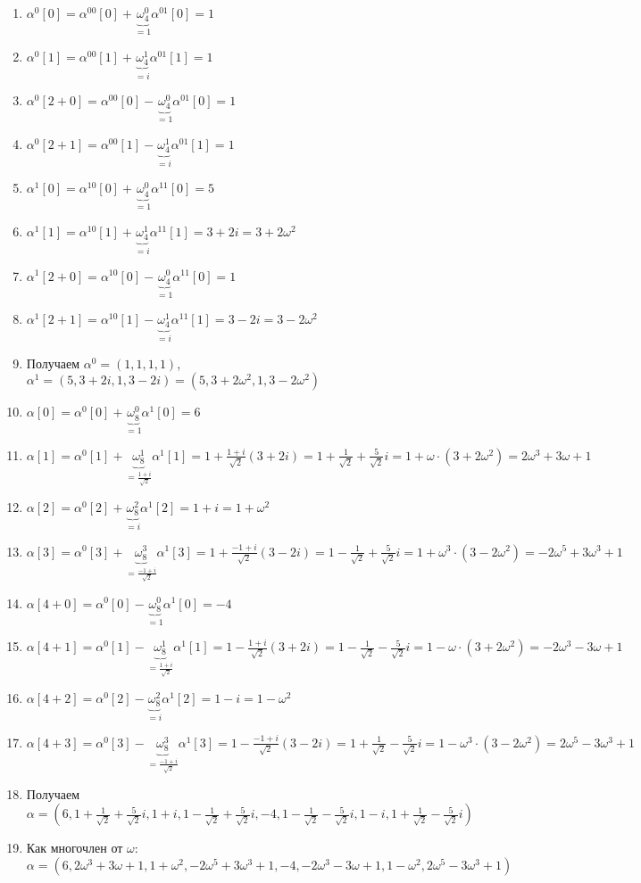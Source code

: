 \documentclass[a4paper]{article}
\begin{document}
\begin{enumerate}
\begin{enumerate}
\item $\alpha^0[0]=\alpha^{00}[0]+\underbrace{\omega_4^0}_{=1}\alpha^{01}[0]=1$
\item $\alpha^0[1]=\alpha^{00}[1]+\underbrace{\omega_4^1}_{=i}\alpha^{01}[1]=1$
\item $\alpha^0[2+0]=\alpha^{00}[0]-\underbrace{\omega_4^0}_{=1}\alpha^{01}[0]=1$
\item $\alpha^0[2+1]=\alpha^{00}[1]-\underbrace{\omega_4^1}_{=i}\alpha^{01}[1]=1$
\item $\alpha^1[0]=\alpha^{10}[0]+\underbrace{\omega_4^0}_{=1}\alpha^{11}[0]=5$
\item $\alpha^1[1]=\alpha^{10}[1]+\underbrace{\omega_4^1}_{=i}\alpha^{11}[1]=3+2i=3+2\omega^2$
\item $\alpha^1[2+0]=\alpha^{10}[0]-\underbrace{\omega_4^0}_{=1}\alpha^{11}[0]=1$
\item $\alpha^1[2+1]=\alpha^{10}[1]-\underbrace{\omega_4^1}_{=i}\alpha^{11}[1]=3-2i=3-2\omega^2$
\item Получаем $\alpha^0=(1,1,1,1)$, $\alpha^1=(5,3+2i,1,3-2i)=(5,3+2\omega^2,1,3-2\omega^2)$
\item $\alpha[0]=\alpha^0[0]+\underbrace{\omega_8^0}_{=1}\alpha^1[0]=6$
\item $\alpha[1]=\alpha^0[1]+\underbrace{\omega_8^1}_{=\frac{1+i}{\sqrt{2}}}\alpha^1[1]=1+\frac{1+i}{\sqrt{2}}(3+2i)=1+\frac{1}{\sqrt{2}}+\frac{5}{\sqrt{2}}i=1+\omega\cdot(3+2\omega^2)=2\omega^3+3\omega+1$
\item $\alpha[2]=\alpha^0[2]+\underbrace{\omega_8^2}_{=i}\alpha^1[2]=1+i=1+\omega^2$
\item $\alpha[3]=\alpha^0[3]+\underbrace{\omega_8^3}_{=\frac{-1+i}{\sqrt{2}}}\alpha^1[3]=1+\frac{-1+i}{\sqrt{2}}(3-2i)=1-\frac{1}{\sqrt{2}}+\frac{5}{\sqrt{2}}i=1+\omega^3\cdot(3-2\omega^2)=-2\omega^5+3\omega^3+1$

\item $\alpha[4+0]=\alpha^0[0]-\underbrace{\omega_8^0}_{=1}\alpha^1[0]=-4$
\item $\alpha[4+1]=\alpha^0[1]-\underbrace{\omega_8^1}_{=\frac{1+i}{\sqrt{2}}}\alpha^1[1]=1-\frac{1+i}{\sqrt{2}}(3+2i)=1-\frac{1}{\sqrt{2}}-\frac{5}{\sqrt{2}}i=1-\omega\cdot(3+2\omega^2)=-2\omega^3-3\omega+1$
\item $\alpha[4+2]=\alpha^0[2]-\underbrace{\omega_8^2}_{=i}\alpha^1[2]=1-i=1-\omega^2$
\item $\alpha[4+3]=\alpha^0[3]-\underbrace{\omega_8^3}_{=\frac{-1+i}{\sqrt{2}}}\alpha^1[3]=1-\frac{-1+i}{\sqrt{2}}(3-2i)=1+\frac{1}{\sqrt{2}}-\frac{5}{\sqrt{2}}i=1-\omega^3\cdot(3-2\omega^2)=2\omega^5-3\omega^3+1$
\item Получаем $\alpha=(6,1+\frac{1}{\sqrt{2}}+\frac{5}{\sqrt{2}}i,1+i,1-\frac{1}{\sqrt{2}}+\frac{5}{\sqrt{2}}i,-4,1-\frac{1}{\sqrt{2}}-\frac{5}{\sqrt{2}}i,1-i,1+\frac{1}{\sqrt{2}}-\frac{5}{\sqrt{2}}i)$
\item Как многочлен от $\omega$: $\alpha=(6,2\omega^3+3\omega+1,1+\omega^2,-2\omega^5+3\omega^3+1,-4,-2\omega^3-3\omega+1,1-\omega^2,2\omega^5-3\omega^3+1)$
\end{enumerate}



\end{enumerate}
\end{document}
